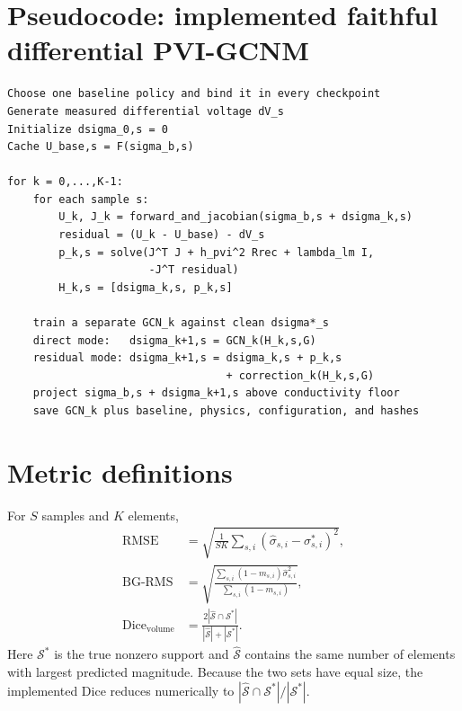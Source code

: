 \documentclass[11pt]{article}
\begin{document}
\section{Pseudocode: implemented faithful differential PVI-GCNM}

\begin{lstlisting}
Choose one baseline policy and bind it in every checkpoint
Generate measured differential voltage dV_s
Initialize dsigma_0,s = 0
Cache U_base,s = F(sigma_b,s)

for k = 0,...,K-1:
    for each sample s:
        U_k, J_k = forward_and_jacobian(sigma_b,s + dsigma_k,s)
        residual = (U_k - U_base) - dV_s
        p_k,s = solve(J^T J + h_pvi^2 Rrec + lambda_lm I,
                      -J^T residual)
        H_k,s = [dsigma_k,s, p_k,s]

    train a separate GCN_k against clean dsigma*_s
    direct mode:   dsigma_k+1,s = GCN_k(H_k,s,G)
    residual mode: dsigma_k+1,s = dsigma_k,s + p_k,s
                                  + correction_k(H_k,s,G)
    project sigma_b,s + dsigma_k+1,s above conductivity floor
    save GCN_k plus baseline, physics, configuration, and hashes
\end{lstlisting}

\section{Metric definitions}

For $S$ samples and $K$ elements,
\begin{align}
  \mathrm{RMSE} &= \sqrt{\frac{1}{SK}\sum_{s,i}
  (\widehat\sigma_{s,i}-\sigma^*_{s,i})^2},\\
  \mathrm{BG\mbox{-}RMS} &= \sqrt{
  \frac{\sum_{s,i}(1-m_{s,i})\widehat\sigma_{s,i}^2}
       {\sum_{s,i}(1-m_{s,i})}},\\
  \mathrm{Dice}_{\mathrm{volume}} &=
  \frac{2|\widehat{\mathcal S}\cap\mathcal S^*|}
       {|\widehat{\mathcal S}|+|\mathcal S^*|}.
\end{align}
Here $\mathcal S^*$ is the true nonzero support and $\widehat{\mathcal S}$ contains
the same number of elements with largest predicted magnitude.  Because the two
sets have equal size, the implemented Dice reduces numerically to
$|\widehat{\mathcal S}\cap\mathcal S^*|/|\mathcal S^*|$.
\end{document}
